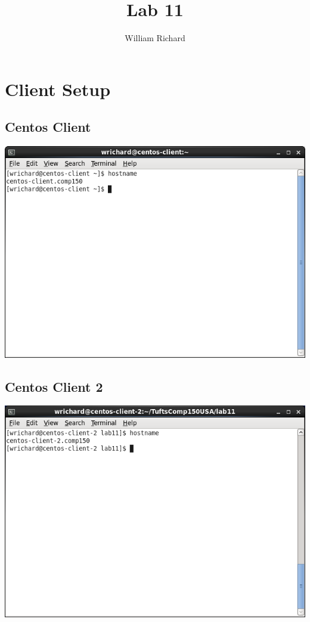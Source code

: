\documentclass[a4paper,10pt]{article}
\title{Lab 11}
\author{William Richard}
\begin{document}
\maketitle

\section{Client Setup}
\subsection{Centos Client}
  \begin{center}
  \includegraphics[width=\linewidth]{./centos-client-hostname.png}
  \end{center}

\subsection{Centos Client 2}
  \begin{center}
  \includegraphics[width=\linewidth]{./centos-client-2-hostname.png}
  \end{center}
\end{document}
